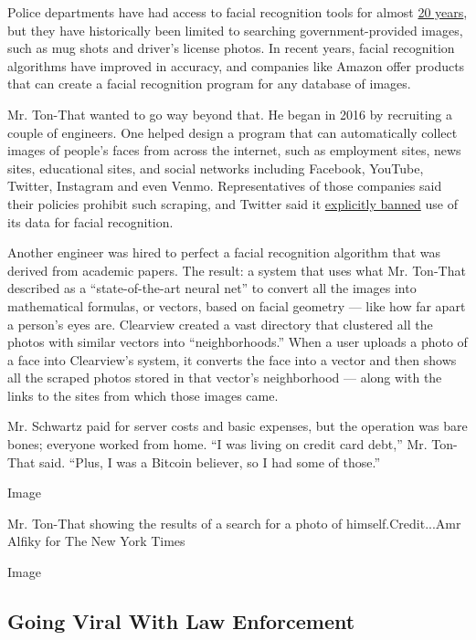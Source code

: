 Police departments have had access to facial recognition tools for
almost
\href{https://www.nytimes.com/2020/01/12/technology/facial-recognition-police.html}{20
years}, but they have historically been limited to searching
government-provided images, such as mug shots and driver's license
photos. In recent years, facial recognition algorithms have improved in
accuracy, and companies like Amazon offer products that can create a
facial recognition program for any database of images.

Mr. Ton-That wanted to go way beyond that. He began in 2016 by
recruiting a couple of engineers. One helped design a program that can
automatically collect images of people's faces from across the internet,
such as employment sites, news sites, educational sites, and social
networks including Facebook, YouTube, Twitter, Instagram and even Venmo.
Representatives of those companies said their policies prohibit such
scraping, and Twitter said it
\href{https://developer.twitter.com/en/developer-terms/more-on-restricted-use-cases}{explicitly
banned} use of its data for facial recognition.

Another engineer was hired to perfect a facial recognition algorithm
that was derived from academic papers. The result: a system that uses
what Mr. Ton-That described as a ``state-of-the-art neural net'' to
convert all the images into mathematical formulas, or vectors, based on
facial geometry --- like how far apart a person's eyes are. Clearview
created a vast directory that clustered all the photos with similar
vectors into ``neighborhoods.'' When a user uploads a photo of a face
into Clearview's system, it converts the face into a vector and then
shows all the scraped photos stored in that vector's neighborhood ---
along with the links to the sites from which those images came.

Mr. Schwartz paid for server costs and basic expenses, but the operation
was bare bones; everyone worked from home. ``I was living on credit card
debt,'' Mr. Ton-That said. ``Plus, I was a Bitcoin believer, so I had
some of those.''

Image

Mr. Ton-That showing the results of a search for a photo of
himself.Credit...Amr Alfiky for The New York Times

Image

\hypertarget{going-viral-with-law-enforcement}{%
\subsection{Going Viral With Law
Enforcement}\label{going-viral-with-law-enforcement}}

